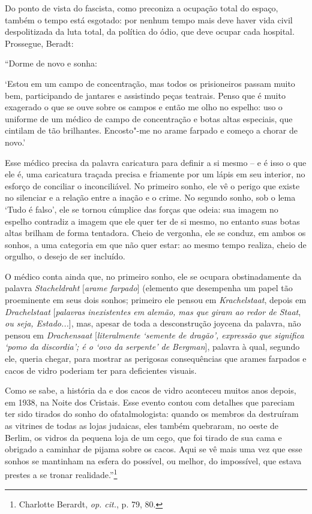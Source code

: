 Do ponto de vista do fascista, como preconiza a ocupação total do
espaço, também o tempo está esgotado: por nenhum tempo mais deve haver
vida civil despolitizada da luta total, da política do ódio, que deve
ocupar cada hospital. Prossegue, Beradt:

``Dorme de novo e sonha:

`Estou em um campo de concentração, mas todos os prisioneiros passam
muito bem, participando de jantares e assistindo peças teatrais. Penso
que é muito exagerado o que se ouve sobre os campos e então me olho no
espelho: uso o uniforme de um médico de campo de concentração e botas
altas especiais, que cintilam de tão brilhantes. Encosto"-me no arame
farpado e começo a chorar de novo.'

Esse médico precisa da palavra caricatura para definir a si mesmo -- e é
isso o que ele é, uma caricatura traçada precisa e friamente por um
lápis em seu interior, no esforço de conciliar o inconciliável. No
primeiro sonho, ele vê o perigo que existe no silenciar e a relação
entre a inação e o crime. No segundo sonho, sob o lema `Tudo é falso',
ele se tornou cúmplice das forças que odeia: sua imagem no espelho
contradiz a imagem que ele quer ter de si mesmo, no entanto suas botas
altas brilham de forma tentadora. Cheio de vergonha, ele se conduz, em
ambos os sonhos, a uma categoria em que não quer estar: ao mesmo tempo
realiza, cheio de orgulho, o desejo de ser incluído.

O médico conta ainda que, no primeiro sonho, ele se ocupara
obstinadamente da palavra \emph{Stacheldraht} {[}\emph{arame farpado}{]}
(elemento que desempenha um papel tão proeminente em seus dois sonhos;
primeiro ele pensou em \emph{Krachelstaat}, depois em
\emph{Drachelstaat} {[}\emph{palavras inexistentes em alemão, mas que
giram ao redor de Staat}, \emph{ou seja, Estado...}{]}, mas, apesar de
toda a desconstrução joycena da palavra, não pensou em
\emph{Drachensaat} {[}\emph{literalmente `semente de dragão', expressão
que significa `pomo da discordia'; é o `ovo da serpente' de Bergman}{]},
palavra à qual, segundo ele, queria chegar, para mostrar as perigosas
consequências que arames farpados e cacos de vidro poderiam ter para
deficientes visuais.

Como se sabe, a história da  e dos cacos de vidro aconteceu muitos
anos depois, em 1938, na Noite dos Cristais. Esse evento contou com
detalhes que pareciam ter sido tirados do sonho do ofatalmologista:
quando os membros da  destruíram as vitrines de todas as lojas
judaicas, eles também quebraram, no oeste de Berlim, os vidros da
pequena loja de um cego, que foi tirado de sua cama e obrigado a
caminhar de pijama sobre os cacos. Aqui se vê mais uma vez que esse
sonhos se mantinham na esfera do possível, ou melhor, do impossível, que
estava prestes a se tronar realidade.''\footnote{Charlotte Berardt,
  \emph{op. cit.}, p. 79, 80.}

